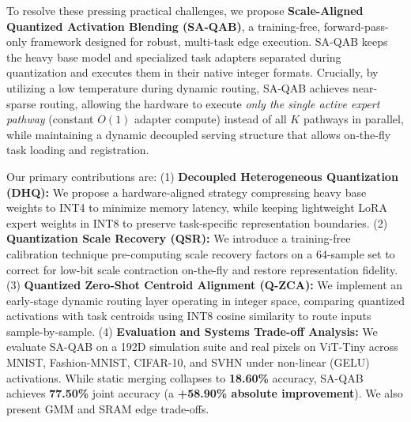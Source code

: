 To resolve these pressing practical challenges, we propose \textbf{Scale-Aligned Quantized Activation Blending (SA-QAB)}, a training-free, forward-pass-only framework designed for robust, multi-task edge execution. SA-QAB keeps the heavy base model and specialized task adapters separated during quantization and executes them in their native integer formats. Crucially, by utilizing a low temperature during dynamic routing, SA-QAB achieves near-sparse routing, allowing the hardware to execute \emph{only the single active expert pathway} (constant $O(1)$ adapter compute) instead of all $K$ pathways in parallel, while maintaining a dynamic decoupled serving structure that allows on-the-fly task loading and registration.

Our primary contributions are:
(1) \textbf{Decoupled Heterogeneous Quantization (DHQ):} We propose a hardware-aligned strategy compressing heavy base weights to INT4 to minimize memory latency, while keeping lightweight LoRA expert weights in INT8 to preserve task-specific representation boundaries.
(2) \textbf{Quantization Scale Recovery (QSR):} We introduce a training-free calibration technique pre-computing scale recovery factors on a 64-sample set to correct for low-bit scale contraction on-the-fly and restore representation fidelity.
(3) \textbf{Quantized Zero-Shot Centroid Alignment (Q-ZCA):} We implement an early-stage dynamic routing layer operating in integer space, comparing quantized activations with task centroids using INT8 cosine similarity to route inputs sample-by-sample.
(4) \textbf{Evaluation and Systems Trade-off Analysis:} We evaluate SA-QAB on a 192D simulation suite and real pixels on ViT-Tiny across MNIST, Fashion-MNIST, CIFAR-10, and SVHN under non-linear (GELU) activations. While static merging collapses to \textbf{18.60\%} accuracy, SA-QAB achieves \textbf{77.50\%} joint accuracy (a \textbf{+58.90\% absolute improvement}). We also present GMM and SRAM edge trade-offs.
